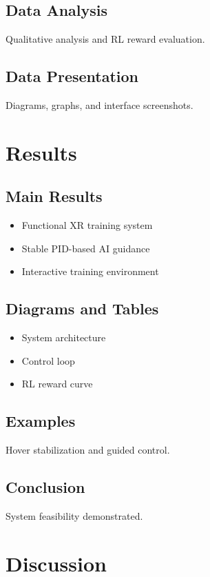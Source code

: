 \documentclass[12pt]{article}
\begin{document}
\subsection{Data Analysis}
Qualitative analysis and RL reward evaluation.

\subsection{Data Presentation}
Diagrams, graphs, and interface screenshots.



\newpage
\section{Results}

\subsection{Main Results}
\begin{itemize}
    \item Functional XR training system
    \item Stable PID-based AI guidance
    \item Interactive training environment
\end{itemize}

\subsection{Diagrams and Tables}
\begin{itemize}
    \item System architecture
    \item Control loop
    \item RL reward curve
\end{itemize}

\subsection{Examples}
Hover stabilization and guided control.

\subsection{Conclusion}
System feasibility demonstrated.

\newpage
\section{Discussion}
\end{document}
